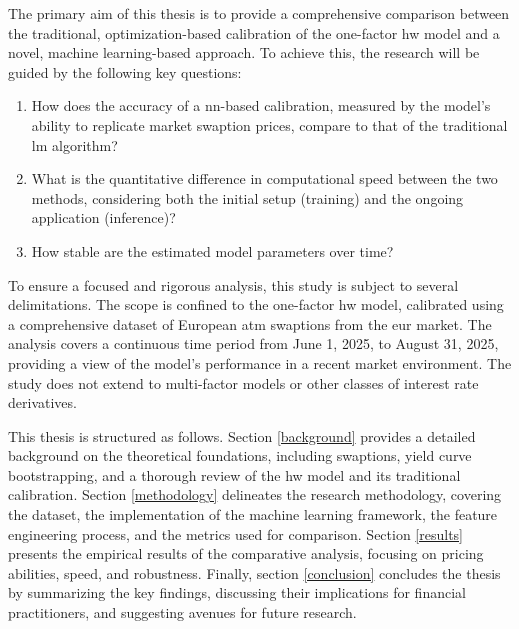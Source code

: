 The primary aim of this thesis is to provide a comprehensive comparison between the traditional, optimization-based calibration of the one-factor \ac{hw} model and a novel, machine learning-based approach. To achieve this, the research will be guided by the following key questions:
\begin{enumerate}
	\item How does the accuracy of a \ac{nn}-based calibration, measured by the model's ability to replicate market swaption prices, compare to that of the traditional \ac{lm} algorithm?
	\item What is the quantitative difference in computational speed between the two methods, considering both the initial setup (training) and the ongoing application (inference)?
	\item How stable are the estimated model parameters over time?
\end{enumerate}

To ensure a focused and rigorous analysis, this study is subject to several delimitations. The scope is confined to the one-factor \ac{hw} model, calibrated using a comprehensive dataset of European \ac{atm} swaptions from the \ac{eur} market. The analysis covers a continuous time period from June 1, 2025, to August 31, 2025, providing a view of the model's performance in a recent market environment. The study does not extend to multi-factor models or other classes of interest rate derivatives.

This thesis is structured as follows. Section \ref{background} provides a detailed background on the theoretical foundations, including swaptions, yield curve bootstrapping, and a thorough review of the \ac{hw} model and its traditional calibration. Section \ref{methodology} delineates the research methodology, covering the dataset, the implementation of the machine learning framework, the feature engineering process, and the metrics used for comparison. Section \ref{results} presents the empirical results of the comparative analysis, focusing on pricing abilities, speed, and robustness. Finally, section \ref{conclusion} concludes the thesis by summarizing the key findings, discussing their implications for financial practitioners, and suggesting avenues for future research.